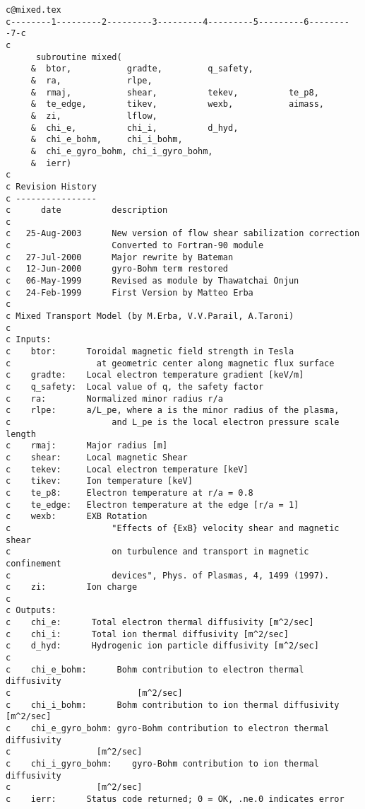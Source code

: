 \begin{verbatim}
c@mixed.tex
c--------1---------2---------3---------4---------5---------6---------7-c
c
      subroutine mixed(
     &  btor,           gradte,         q_safety,
     &  ra,             rlpe,
     &  rmaj,           shear,          tekev,          te_p8,
     &  te_edge,        tikev,          wexb,           aimass,
     &  zi,             lflow,
     &  chi_e,          chi_i,          d_hyd,
     &  chi_e_bohm,     chi_i_bohm,
     &  chi_e_gyro_bohm, chi_i_gyro_bohm,
     &  ierr)
c
c Revision History
c ----------------
c      date          description
c
c   25-Aug-2003      New version of flow shear sabilization correction
c                    Converted to Fortran-90 module
c   27-Jul-2000      Major rewrite by Bateman
c   12-Jun-2000      gyro-Bohm term restored
c   06-May-1999      Revised as module by Thawatchai Onjun
c   24-Feb-1999      First Version by Matteo Erba
c
c Mixed Transport Model (by M.Erba, V.V.Parail, A.Taroni)
c
c Inputs:
c    btor:      Toroidal magnetic field strength in Tesla
c                 at geometric center along magnetic flux surface
c    gradte:    Local electron temperature gradient [keV/m]
c    q_safety:  Local value of q, the safety factor
c    ra:        Normalized minor radius r/a
c    rlpe:      a/L_pe, where a is the minor radius of the plasma,
c                    and L_pe is the local electron pressure scale length
c    rmaj:      Major radius [m]
c    shear:     Local magnetic Shear
c    tekev:     Local electron temperature [keV]
c    tikev:     Ion temperature [keV]
c    te_p8:     Electron temperature at r/a = 0.8
c    te_edge:   Electron temperature at the edge [r/a = 1]
c    wexb:      EXB Rotation
c                    "Effects of {ExB} velocity shear and magnetic shear
c                    on turbulence and transport in magnetic confinement
c                    devices", Phys. of Plasmas, 4, 1499 (1997).
c    zi:        Ion charge
c
c Outputs:
c    chi_e:      Total electron thermal diffusivity [m^2/sec]
c    chi_i:      Total ion thermal diffusivity [m^2/sec]
c    d_hyd:      Hydrogenic ion particle diffusivity [m^2/sec]
c
c    chi_e_bohm:      Bohm contribution to electron thermal diffusivity
c                         [m^2/sec]
c    chi_i_bohm:      Bohm contribution to ion thermal diffusivity [m^2/sec]
c    chi_e_gyro_bohm: gyro-Bohm contribution to electron thermal diffusivity
c                 [m^2/sec]
c    chi_i_gyro_bohm:    gyro-Bohm contribution to ion thermal diffusivity
c                 [m^2/sec]
c    ierr:      Status code returned; 0 = OK, .ne.0 indicates error

\end{verbatim}
